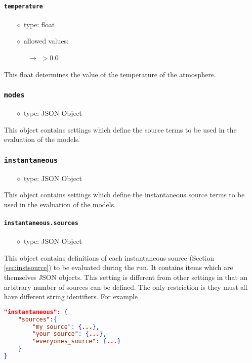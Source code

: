 \documentclass[]{article}
\def\code#1{\texttt{#1}}
\begin{document}
\paragraph{\code{temperature}}\label{sec:temperature}
\begin{itemize}
    \item[$\diamond$] type: float 
    \item[$\diamond$] allowed values:
    \begin{itemize}
        \item[$\rightarrow$] $>0.0$ 
    \end{itemize}
\end{itemize}
This float determines the value of the temperature of the atmosphere.

\subsubsection{\code{modes}}
\begin{itemize}
    \item[$\diamond$] type: JSON Object 
\end{itemize}
This object contains settings which define the source terms to be used in the
evaluation of the models.

\subsubsection{\code{instantaneous}}
\begin{itemize}
    \item[$\diamond$] type: JSON Object 
\end{itemize}
This object contains settings which define the instantaneous source terms to be
used in the evaluation of the models.

\paragraph{\code{instantaneous.sources}}\label{sec:instsources}
\begin{itemize}
    \item[$\diamond$] type: JSON Object 
\end{itemize}
This object contains definitions of each instantaneous source (Section
\ref{sec:instsource}) to be evaluated during the run. It contains items which
are themselves JSON objects. This setting is different from other settings in
that an arbitrary number of sources can be defined. The only restriction is they
must all have different string identifiers. For example\\
\begin{lstlisting}[language=json,firstnumber=1]
"instantaneous": {
    "sources":{
        "my_source": {...},
        "your_source": {...},
        "everyones_source": {...}
    }
}
\end{lstlisting}
\end{document}
